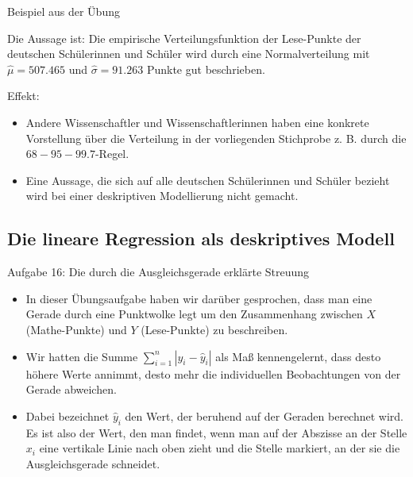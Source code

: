 \documentclass[usenames,dvipsnames,handout]{beamer}
\begin{document}
\begin{frame}{Beispiel aus der Übung}


\begin{block}{ Die Aussage ist:}
Die empirische Verteilungsfunktion der Lese-Punkte der deutschen Schülerinnen und Schüler wird durch eine Normalverteilung mit
 $\hat{\mu}=507.465$ und $\hat{\sigma}=91.263$ Punkte gut beschrieben.
\end{block}\pause
Effekt: 
\begin{itemize}
\item{Andere Wissenschaftler und Wissenschaftlerinnen haben eine konkrete Vorstellung
über die Verteilung in der vorliegenden Stichprobe z. B. durch die $68-95-99.7$-Regel.}\pause
\item{Eine Aussage, die sich auf alle deutschen Schülerinnen und Schüler bezieht
wird bei einer deskriptiven Modellierung nicht gemacht.}
\end{itemize}
\end{frame}
\subsection{Die lineare Regression als deskriptives Modell}

\begin{frame}{Aufgabe 16: Die durch die Ausgleichsgerade erklärte Streuung}
\begin{itemize}
\item{In dieser Übungsaufgabe haben wir darüber gesprochen, dass man eine Gerade durch eine
Punktwolke legt um den Zusammenhang zwischen $X$ (Mathe-Punkte)
und $Y$ (Lese-Punkte) zu beschreiben.}\pause
\item{Wir hatten die Summe $\sum_{i=1}^{n}|y_{i}-\hat{y}_{i}|$ als Maß
kennengelernt, dass desto höhere Werte annimmt, desto mehr die individuellen
Beobachtungen von der Gerade abweichen.}\pause
\item{Dabei bezeichnet $\hat{y}_{i}$ den Wert, der beruhend auf der Geraden
berechnet wird. Es ist also der Wert, 
den man findet, wenn man auf der Abszisse an der Stelle
$x_{i}$ eine vertikale Linie nach oben zieht und die Stelle markiert,
an der sie die Ausgleichsgerade schneidet.}
\end{itemize}
\end{frame}
\end{document}
